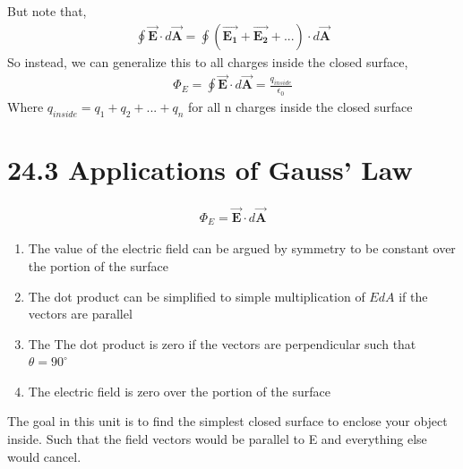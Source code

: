 \documentclass[12pt, titlepage, oneside]{article}
\let\oldvec\vec
\renewcommand{\vec}[1]{\oldvec{\bm{#1}}}
\begin{document}
\noindent But note that,
\begin{align*}
	\oint \vec{E}\cdot d\vec{A} = \oint (\vec{E_1}+\vec{E_2}+...)\cdot d \vec{A}
\end{align*}
So instead, we can generalize this to all charges inside the closed surface,
\begin{align*}
\Phi_E = \oint \vec{E} \cdot d\vec{A} = \frac{q_{inside}}{\epsilon_0}
\end{align*}
Where $q_{inside} = q_1 + q_2 + ... + q_n$ for all n charges inside the closed surface
\newpage
\section*{24.3 Applications of Gauss' Law}
\begin{align*}
\Phi_E = \vec{E} \cdot d\vec{A}
\end{align*}
\begin{enumerate}
	\item The value of the electric field can be argued by symmetry to be constant over the portion of the surface
	\item The dot product can be simplified to simple multiplication of $E dA$ if the vectors are parallel
	\item The The dot product is zero if the vectors are perpendicular such that $\theta = 90^{\circ}$
	\item The electric field is zero over the portion of the surface
\end{enumerate}
The goal in this unit is to find the simplest closed surface to enclose your object inside. Such that the field vectors would be parallel to E and everything else would cancel.\\
\end{document}

